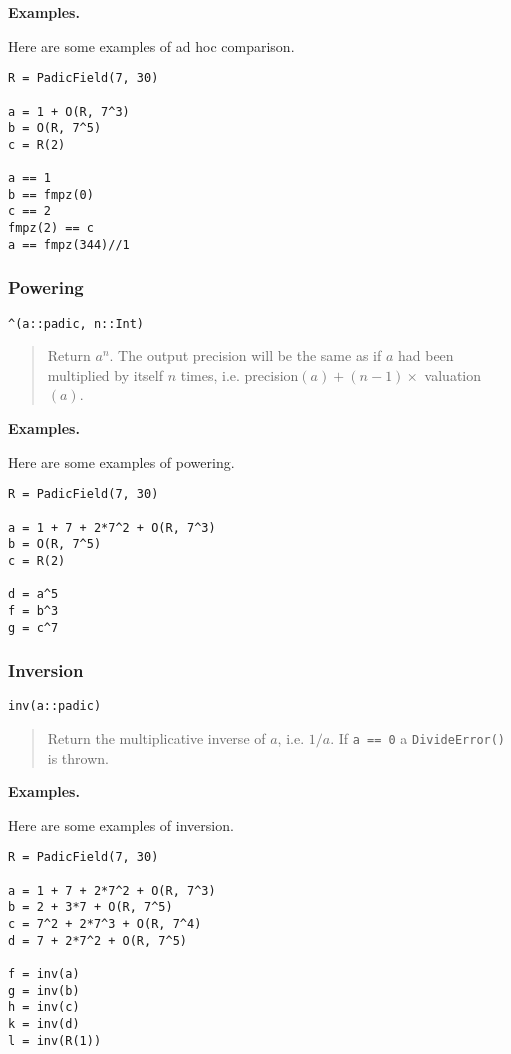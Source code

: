 \documentclass[a4paper,10pt]{article}
\newcommand{\code}{\lstinline}
\newcommand{\desc}[1]{\vspace{-3mm}\begin{quote}#1\end{quote}}
\begin{document}
{{\textbf{Examples.}

Here are some examples of ad hoc comparison.

\begin{lstlisting}
R = PadicField(7, 30)

a = 1 + O(R, 7^3)
b = O(R, 7^5)
c = R(2)

a == 1
b == fmpz(0)
c == 2
fmpz(2) == c
a == fmpz(344)//1
\end{lstlisting}

\subsubsection{Powering}

\begin{lstlisting}
^(a::padic, n::Int)
\end{lstlisting}

\desc{Return $a^n$. The output precision will be the same as if $a$ had been
multiplied by itself $n$ times, i.e. precision$(a) + (n - 1)\times$
valuation$(a)$.}

\textbf{Examples.}

Here are some examples of powering.

\begin{lstlisting}
R = PadicField(7, 30)

a = 1 + 7 + 2*7^2 + O(R, 7^3)
b = O(R, 7^5)
c = R(2)

d = a^5
f = b^3
g = c^7
\end{lstlisting}

\subsubsection{Inversion}

\begin{lstlisting}
inv(a::padic)
\end{lstlisting}

\desc{Return the multiplicative inverse of $a$, i.e. $1/a$. If \code{a == 0}
a \code{DivideError()} is thrown.}

\textbf{Examples.}

Here are some examples of inversion.

\begin{lstlisting}
R = PadicField(7, 30)

a = 1 + 7 + 2*7^2 + O(R, 7^3)
b = 2 + 3*7 + O(R, 7^5)
c = 7^2 + 2*7^3 + O(R, 7^4)
d = 7 + 2*7^2 + O(R, 7^5)

f = inv(a)
g = inv(b)
h = inv(c)
k = inv(d)
l = inv(R(1))
\end{lstlisting}

}}
\end{document}
